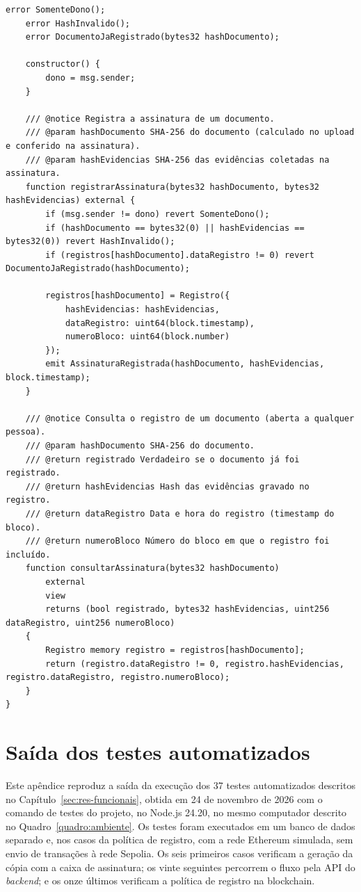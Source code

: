 \documentclass[
    12pt,
    a4paper,
    oneside,
    chapter=TITLE,
    section=TITLE,
    subsection=TITLE,
    subsubsection=TITLE,
    sumario=tradicional,
    english,
    brazil
]{abntex2}
\begin{document}
\begin{apendicesenv}
\begin{lstlisting}[style=codigo]
    error SomenteDono();
    error HashInvalido();
    error DocumentoJaRegistrado(bytes32 hashDocumento);

    constructor() {
        dono = msg.sender;
    }

    /// @notice Registra a assinatura de um documento.
    /// @param hashDocumento SHA-256 do documento (calculado no upload e conferido na assinatura).
    /// @param hashEvidencias SHA-256 das evidências coletadas na assinatura.
    function registrarAssinatura(bytes32 hashDocumento, bytes32 hashEvidencias) external {
        if (msg.sender != dono) revert SomenteDono();
        if (hashDocumento == bytes32(0) || hashEvidencias == bytes32(0)) revert HashInvalido();
        if (registros[hashDocumento].dataRegistro != 0) revert DocumentoJaRegistrado(hashDocumento);

        registros[hashDocumento] = Registro({
            hashEvidencias: hashEvidencias,
            dataRegistro: uint64(block.timestamp),
            numeroBloco: uint64(block.number)
        });
        emit AssinaturaRegistrada(hashDocumento, hashEvidencias, block.timestamp);
    }

    /// @notice Consulta o registro de um documento (aberta a qualquer pessoa).
    /// @param hashDocumento SHA-256 do documento.
    /// @return registrado Verdadeiro se o documento já foi registrado.
    /// @return hashEvidencias Hash das evidências gravado no registro.
    /// @return dataRegistro Data e hora do registro (timestamp do bloco).
    /// @return numeroBloco Número do bloco em que o registro foi incluído.
    function consultarAssinatura(bytes32 hashDocumento)
        external
        view
        returns (bool registrado, bytes32 hashEvidencias, uint256 dataRegistro, uint256 numeroBloco)
    {
        Registro memory registro = registros[hashDocumento];
        return (registro.dataRegistro != 0, registro.hashEvidencias, registro.dataRegistro, registro.numeroBloco);
    }
}
\end{lstlisting}

\chapter{Saída dos testes automatizados}
\label{ap:testes}

Este apêndice reproduz a saída da execução dos 37 testes automatizados descritos no Capítulo~\ref{sec:res-funcionais}, obtida em 24 de novembro de 2026 com o comando de testes do projeto, no Node.js 24.20, no mesmo computador descrito no Quadro~\ref{quadro:ambiente}. Os testes foram executados em um banco de dados separado e, nos casos da política de registro, com a rede Ethereum simulada, sem envio de transações à rede Sepolia. Os seis primeiros casos verificam a geração da cópia com a caixa de assinatura; os vinte seguintes percorrem o fluxo pela API do \emph{backend}; e os onze últimos verificam a política de registro na blockchain.


\end{apendicesenv}
\end{document}

